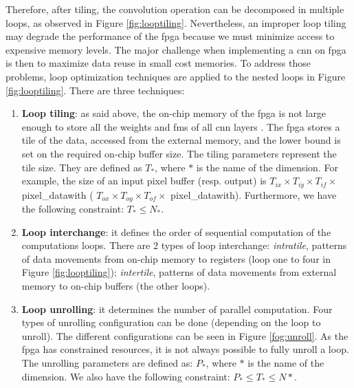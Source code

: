 Therefore, after tiling, the convolution operation can be decomposed in multiple loops, as observed in Figure \ref{fig:looptiling}. Nevertheless, an improper loop tiling may degrade the performance of the \acrshort{fpga} because we must minimize access to expensive memory levels. The major challenge when implementing a \acrshort{cnn} on \acrshort{fpga} is then to maximize data reuse in small cost memories. To address those problems, loop optimization techniques are applied to the nested loops in Figure \ref{fig:looptiling}. There are three techniques:
%
\begin{enumerate}
    \item \textbf{Loop tiling}: as said above, the on-chip memory of the \acrshort{fpga} is not large enough to store all the weights and \acrshort{fm}s of all \acrshort{cnn} layers \cite{abdelouahab_accelerating_2018}. The \acrshort{fpga} stores a tile of the data, accessed from the external memory, and the lower bound is set on the required on-chip buffer size. The tiling parameters represent the tile size. They are defined as $T_{*}$, where $*$ is the name of the dimension. For example, the size of an input pixel buffer (resp. output) is $T_{ix} \times T_{iy} \times T_{if} \times $ pixel\_datawith ( $ T_{ox} \times T_{oy} \times T_{of} \times $ pixel\_datawith). Furthermore, we have the following constraint: $T_{*} \leq N_{*}$.
    \item \textbf{Loop interchange}: it defines the order of sequential computation of the computations loops. There are 2 types of loop interchange: \textit{intratile}, patterns of data movements from on-chip memory to registers (loop one to four in Figure \ref{fig:looptiling}); \textit{intertile}, patterns of data movements from external memory to on-chip buffers (the other loops).
    \item \textbf{Loop unrolling}: it determines the number of parallel computation. Four types of unrolling configuration can be done (depending on the loop to unroll). The different configurations can be seen in Figure \ref{fog:unroll}. As the \acrshort{fpga} has constrained resources, it is not always possible to fully unroll a loop. The unrolling parameters are defined as: $P_{*}$, where $*$ is the name of the dimension. We also have the following constraint: $P_{*} \leq T_{*} \leq N{*}$.
\end{enumerate}
%
